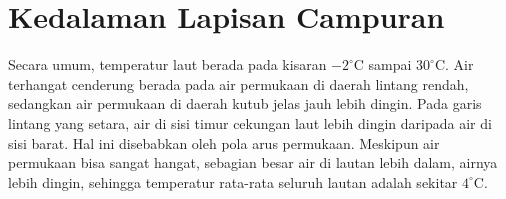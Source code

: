 \section[Kedalaman Lapisan Campuran]{Kedalaman Lapisan Campuran}
\begin{spacing}{1.5}
	Secara umum, temperatur laut berada pada kisaran $-2^\circ$C sampai $30^\circ$C. Air terhangat cenderung berada pada air permukaan di daerah lintang rendah, sedangkan air permukaan di daerah kutub jelas jauh lebih dingin. Pada garis lintang yang setara, air di sisi timur cekungan laut lebih dingin daripada air di sisi barat. Hal ini disebabkan oleh pola arus permukaan. Meskipun air permukaan bisa sangat hangat, sebagian besar air di lautan lebih dalam, airnya lebih dingin, sehingga temperatur rata-rata seluruh lautan adalah sekitar $4^\circ$C.
	

\end{spacing}
